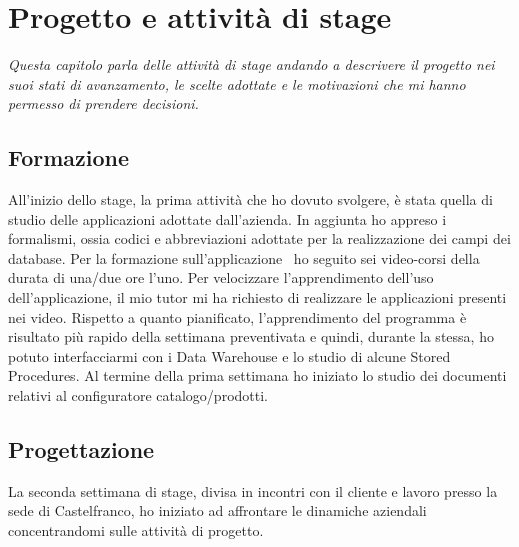 \chapter{Progetto e attività di stage}
\textit{Questa capitolo parla delle attività di stage andando a descrivere il progetto nei suoi stati di avanzamento, le scelte adottate e le motivazioni che mi hanno permesso di prendere decisioni.}

\section{Formazione}
All'inizio dello stage, la prima attività che ho dovuto svolgere, è stata quella di studio delle applicazioni adottate dall'azienda. In aggiunta ho appreso i formalismi, ossia codici e abbreviazioni adottate per la realizzazione dei campi dei database. 
Per la formazione sull'applicazione \inde\, ho seguito sei video-corsi della durata di una/due ore l'uno. Per velocizzare l'apprendimento dell'uso dell'applicazione, il mio tutor mi ha richiesto di realizzare le applicazioni presenti nei video.
Rispetto a quanto pianificato, l'apprendimento del programma è risultato più rapido della settimana preventivata e quindi, durante la stessa, ho potuto interfacciarmi con i Data Warehouse e lo studio di alcune Stored Procedures. 
Al termine della prima settimana ho iniziato lo studio dei documenti relativi al configuratore catalogo/prodotti.


\section{Progettazione}
La seconda settimana di stage, divisa in incontri con il cliente e lavoro presso la sede di Castelfranco, ho iniziato ad affrontare le dinamiche aziendali concentrandomi sulle attività di progetto.

